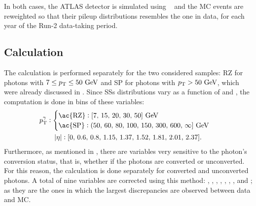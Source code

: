 In both cases, the \ac{ATLAS} detector is simulated using ~\cite{Geant4} and the \ac{MC} events are reweighted so that their pileup distributions resembles the one in data, for each year of the Run-2 data-taking period.


\subsection{Calculation}
\label{subsec:ss_corrections:ffs:calculation}


The calculation is performed separately for the two considered samples: \ac{RZ} for photons with \(7\leq p_{\text{T}}\leq 50~\text{GeV}\) and \ac{SP} for photons with \(p_{\text{T}}> 50~\text{GeV}\), which were already discussed in \Sect{\ref{subsec:pid_ss:pid:event_selection}}. Since \acp{SS} distributions vary as a function of \pt and \abseta, the computation is done in bins of these variables:
\begin{gather}
    \ptgam:
    \begin{cases}
        \text{\ac{RZ}}: [7,\, 15,\, 20,\, 30,\, 50] ~\gev\\
        \text{\ac{SP}}: (50,\, 60,\, 80,\, 100,\, 150,\, 300,\, 600,\, \infty] ~\gev\\
    \end{cases}\\
    \abseta: [0,\, 0.6,\, 0.8,\, 1.15,\, 1.37,\, 1.52,\, 1.81,\, 2.01,\, 2.37].
\end{gather}
Furthermore, as mentioned in \Sect{\ref{sec:pid_ss:ss}}, there are variables very sensitive to the photon's conversion status, that is, whether if the photons are converted or unconverted. For this reason, the calculation is done separately for converted and unconverted photons. A total of nine variables are corrected using this method: \eratio, \fside, \reta, \rphi, \rhad, \rhado, \wone, \weta and \wstot; as they are the ones in which the largest discrepancies are observed between data and \ac{MC}.

